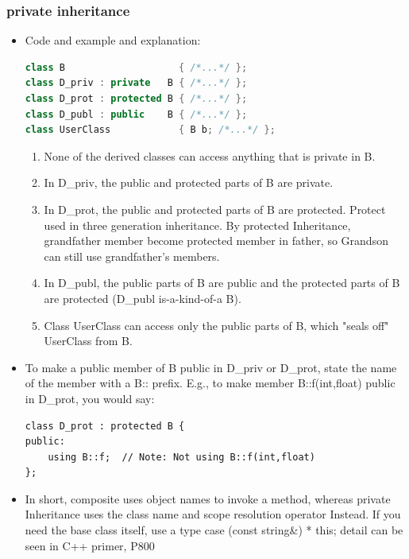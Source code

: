 \documentclass[a4paper,11pt,twoside]{book}
\begin{document}
\subsubsection{private inheritance}
\begin{itemize}
	\item 	Code and example and explanation:
\begin{lstlisting}[frame=single, language=c++]
class B                    { /*...*/ };
class D_priv : private   B { /*...*/ };
class D_prot : protected B { /*...*/ };
class D_publ : public    B { /*...*/ };
class UserClass            { B b; /*...*/ };
\end{lstlisting}
	
	\begin{enumerate}
		\item None of the derived classes can access anything that is private in B.
		
		\item In D\_priv, the public and protected parts of B are private.
		
		\item In D\_prot, the public and protected parts of B are protected. Protect used in three generation inheritance. By protected Inheritance, grandfather member become protected member in father, so Grandson can still use grandfather's members.
		
		\item In D\_publ, the public parts of  B are public and the protected parts of B are protected (D\_publ is-a-kind-of-a B).
		
		\item Class UserClass can access only the public parts of B, which "seals off" UserClass from B.
	\end{enumerate}

	\item To make a public member of B public in D\_priv or D\_prot, state the name of the member with a B:: prefix. E.g., to make member B::f(int,float) public in D\_prot, you would say:
\begin{lstlisting}[numbers=none]
class D_prot : protected B {
public:
	using B::f;  // Note: Not using B::f(int,float)
};
\end{lstlisting}

\item In short, composite uses object names to invoke a method, whereas private Inheritance uses the class name and scope resolution operator Instead. If you need the base class itself, use a type case (const string\&) * this; detail can be seen in C++ primer, P800


\end{itemize}
\end{document}
